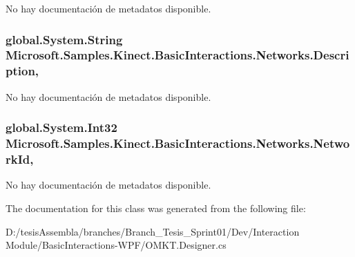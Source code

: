 No hay documentación de metadatos disponible. 

\hypertarget{class_microsoft_1_1_samples_1_1_kinect_1_1_basic_interactions_1_1_networks_a1969361a20ab663c914db19261779f59}{
\subsubsection[{Description}]{\setlength{\rightskip}{0pt plus 5cm}global.\-System.\-String Microsoft.\-Samples.\-Kinect.\-Basic\-Interactions.\-Networks.\-Description\hspace{0.3cm}{\ttfamily [get]}, {\ttfamily [set]}}}\label{class_microsoft_1_1_samples_1_1_kinect_1_1_basic_interactions_1_1_networks_a1969361a20ab663c914db19261779f59}


No hay documentación de metadatos disponible. 

\hypertarget{class_microsoft_1_1_samples_1_1_kinect_1_1_basic_interactions_1_1_networks_acc5bd3a4f8aceda36f2d3945a6713ae9}{
\subsubsection[{Network\-Id}]{\setlength{\rightskip}{0pt plus 5cm}global.\-System.\-Int32 Microsoft.\-Samples.\-Kinect.\-Basic\-Interactions.\-Networks.\-Network\-Id\hspace{0.3cm}{\ttfamily [get]}, {\ttfamily [set]}}}\label{class_microsoft_1_1_samples_1_1_kinect_1_1_basic_interactions_1_1_networks_acc5bd3a4f8aceda36f2d3945a6713ae9}


No hay documentación de metadatos disponible. 



The documentation for this class was generated from the following file\-:\begin{DoxyCompactItemize}
\item 
D\-:/tesis\-Assembla/branches/\-Branch\-\_\-\-Tesis\-\_\-\-Sprint01/\-Dev/\-Interaction Module/\-Basic\-Interactions-\/\-W\-P\-F/O\-M\-K\-T.\-Designer.\-cs\end{DoxyCompactItemize}
